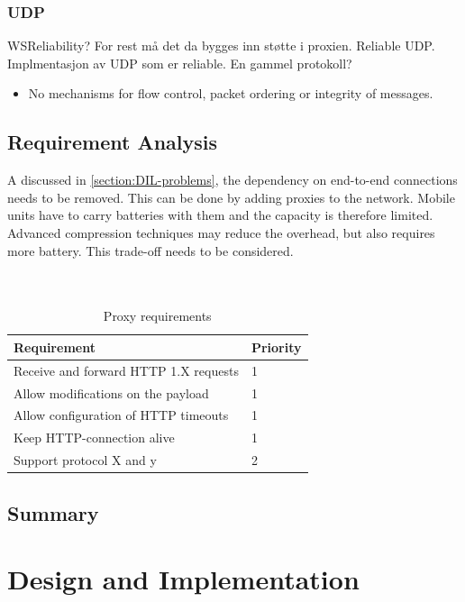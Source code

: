 \documentclass[USenglish]{ifimaster}
\begin{document}
\subsection{UDP}
WSReliability? For rest må det da bygges inn støtte i proxien.
Reliable UDP. Implmentasjon av UDP som er reliable. En gammel protokoll?
\begin{itemize}
    \item No mechanisms for flow control, packet ordering or integrity of
    messages.
\end{itemize}

\section{Requirement Analysis}
A discussed in \cref{section:DIL-problems}, the dependency on end-to-end
connections needs to be removed. This can be done by adding proxies to the
network. Mobile units have to carry batteries with them and the capacity is
therefore limited. Advanced compression techniques may reduce the overhead, but
also requires more battery. This trade-off needs to be considered.
\\ \\ \\
\begin{table}[h]
\begin{tabular}{| l | l |}
\hline
  \textbf{Requirement} & \textbf{Priority} \\ \hline
  Receive and forward HTTP 1.X requests & 1\\ \hline
  Allow modifications on the payload & 1 \\ \hline
  Allow configuration of HTTP timeouts & 1 \\ \hline
  Keep HTTP-connection alive & 1 \\ \hline
  Support protocol X and y & 2 \\ \hline
\end{tabular}
\caption{Proxy requirements}
\end{table}

\section{Summary}



\chapter{Design and Implementation}
\end{document}
